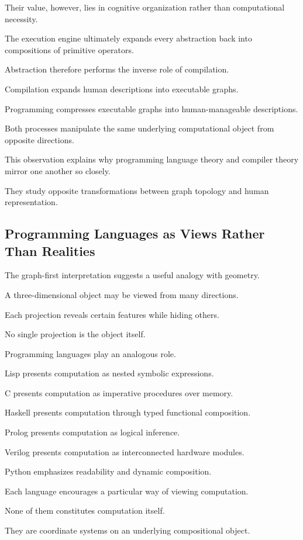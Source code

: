 \documentclass[12pt,oneside]{article}
\begin{document}
Their value, however, lies in cognitive organization rather than computational necessity.

The execution engine ultimately expands every abstraction back into compositions of primitive operators.

Abstraction therefore performs the inverse role of compilation.

Compilation expands human descriptions into executable graphs.

Programming compresses executable graphs into human-manageable descriptions.

Both processes manipulate the same underlying computational object from opposite directions.

This observation explains why programming language theory and compiler theory mirror one another so closely.

They study opposite transformations between graph topology and human representation.

\subsection{Programming Languages as Views Rather Than Realities}

The graph-first interpretation suggests a useful analogy with geometry.

A three-dimensional object may be viewed from many directions.

Each projection reveals certain features while hiding others.

No single projection is the object itself.

Programming languages play an analogous role.

Lisp presents computation as nested symbolic expressions.

C presents computation as imperative procedures over memory.

Haskell presents computation through typed functional composition.

Prolog presents computation as logical inference.

Verilog presents computation as interconnected hardware modules.

Python emphasizes readability and dynamic composition.

Each language encourages a particular way of viewing computation.

None of them constitutes computation itself.

They are coordinate systems on an underlying compositional object.
\end{document}
